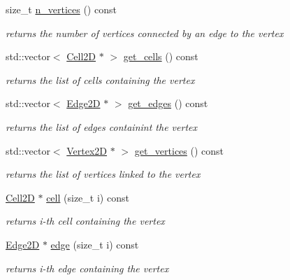 \begin{DoxyCompactItemize}
size\+\_\+t \hyperlink{group__Mesh2D_ga1e24ac52e7546a982bffb879187ce6a6}{n\+\_\+vertices} () const
\begin{DoxyCompactList}\small\item\em returns the number of vertices connected by an edge to the vertex \end{DoxyCompactList}\item 
std\+::vector$<$ \hyperlink{classHCore2D_1_1Cell2D}{Cell2D} $\ast$ $>$ \hyperlink{group__Mesh2D_ga0659e7b5b407353205de9b121dc6835b}{get\+\_\+cells} () const
\begin{DoxyCompactList}\small\item\em returns the list of cells containing the vertex \end{DoxyCompactList}\item 
std\+::vector$<$ \hyperlink{classHCore2D_1_1Edge2D}{Edge2D} $\ast$ $>$ \hyperlink{group__Mesh2D_ga9fa6587cd702066c73db089f74bc36df}{get\+\_\+edges} () const
\begin{DoxyCompactList}\small\item\em returns the list of edges containint the vertex \end{DoxyCompactList}\item 
std\+::vector$<$ \hyperlink{classHCore2D_1_1Vertex2D}{Vertex2D} $\ast$ $>$ \hyperlink{group__Mesh2D_ga5b50d5a22fa7d0ee9a89a024aa409cfa}{get\+\_\+vertices} () const
\begin{DoxyCompactList}\small\item\em returns the list of vertices linked to the vertex \end{DoxyCompactList}\item 
\mbox{\label{classHCore2D_1_1Vertex2D_ad5eb7914636eb9937f84370c6030aed9}} 
\hyperlink{classHCore2D_1_1Cell2D}{Cell2D} $\ast$ \hyperlink{classHCore2D_1_1Vertex2D_ad5eb7914636eb9937f84370c6030aed9}{cell} (size\+\_\+t i) const
\begin{DoxyCompactList}\small\item\em returns i-\/th cell containing the vertex \end{DoxyCompactList}\item 
\mbox{\label{classHCore2D_1_1Vertex2D_afebfae577ee499d5309ff6a3981279de}} 
\hyperlink{classHCore2D_1_1Edge2D}{Edge2D} $\ast$ \hyperlink{classHCore2D_1_1Vertex2D_afebfae577ee499d5309ff6a3981279de}{edge} (size\+\_\+t i) const
\begin{DoxyCompactList}\small\item\em returns i-\/th edge containing the vertex \end{DoxyCompactList}\item 

\end{DoxyCompactItemize}
